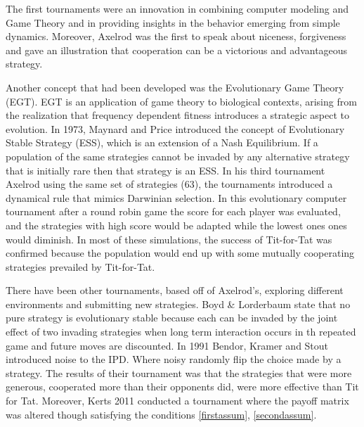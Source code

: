 The first tournaments were an innovation in combining computer modeling and Game
Theory and in providing insights in the behavior emerging from simple dynamics.
Moreover, Axelrod was the first to speak about niceness, forgiveness and gave an
illustration that cooperation can be a victorious and advantageous strategy.

Another concept that had been developed was the Evolutionary Game Theory (EGT).
EGT is an application of game theory to biological contexts, arising from the
realization that frequency dependent fitness introduces a strategic aspect to
evolution. In 1973, Maynard and Price introduced the concept of Evolutionary
Stable Strategy (ESS), which is an extension of a Nash Equilibrium. If a
population of the same strategies cannot be invaded by any alternative strategy
that is initially rare then that strategy is an ESS. In his third tournament
Axelrod \cite{Axelrod1981} using the same set of strategies (63),
the tournaments introduced a dynamical rule that mimics Darwinian selection.
In this evolutionary computer tournament after a round robin game the score for
each player was evaluated, and the strategies with high score would be adapted
while the lowest ones ones would diminish. In most of these simulations, the
success of Tit-for-Tat was confirmed because the population would end up with
some mutually cooperating strategies prevailed by Tit-for-Tat.

There have been other tournaments, based off of Axelrod’s, exploring different
environments and submitting new strategies. Boyd \& Lorderbaum \cite{Lorberbaum1994}
state that no pure
strategy is evolutionary stable because each can be invaded by the joint effect
of two invading strategies when long term interaction occurs in th repeated game
and future moves are discounted. In 1991 Bendor, Kramer and Stout \cite{The2016}
introduced noise to the IPD. Where noisy randomly flip the choice made by a
strategy. The results of their tournament was that the strategies that were more
generous, cooperated more than their opponents did, were more effective than Tit
for Tat. Moreover, Kerts 2011 conducted a tournament where the payoff matrix was
altered though satisfying the conditions \ref{firstassum}, \ref{secondassum}.

